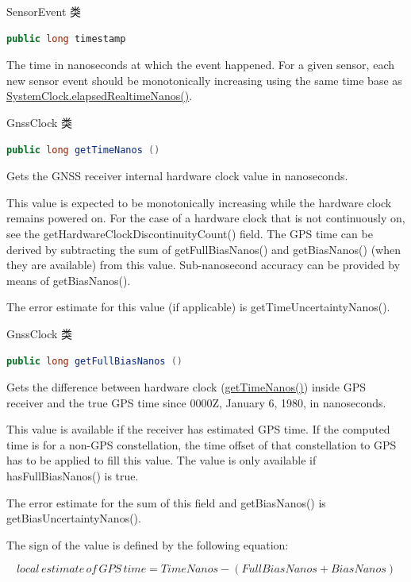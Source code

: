 \documentclass{beamer} %
\begin{document}
\begin{frame}[fragile]{SensorEvent 类}
    \begin{lstlisting}[language = Java]
public long timestamp
    \end{lstlisting}
    The time in nanoseconds at which the event happened. 
    For a given sensor, each new sensor event should be monotonically increasing using the same time base as \hyperlink{CLASSSystemClockMETHODelapsedRealtimeNanos}{SystemClock.elapsedRealtimeNanos()}.
\end{frame}

\begin{frame}[fragile]{GnssClock 类}
\label{CLASSGnssClockMETHODgetTimeNanos}
    \begin{lstlisting}[language = Java]
public long getTimeNanos ()
    \end{lstlisting}
    Gets the GNSS receiver internal hardware clock value in nanoseconds.

    This value is expected to be monotonically increasing while the hardware clock remains powered on. For the case of a hardware clock that is not continuously on, see the getHardwareClockDiscontinuityCount() field. The GPS time can be derived by subtracting the sum of getFullBiasNanos() and getBiasNanos() (when they are available) from this value. Sub-nanosecond accuracy can be provided by means of getBiasNanos().

    The error estimate for this value (if applicable) is getTimeUncertaintyNanos().
\end{frame}

\begin{frame}[fragile]{GnssClock 类}
    \begin{lstlisting}[language = Java]
public long getFullBiasNanos ()
    \end{lstlisting}
    Gets the difference between hardware clock (\hyperlink{CLASSGnssClockMETHODgetTimeNanos}{getTimeNanos()}) inside GPS receiver and the true GPS time since 0000Z, January 6, 1980, in nanoseconds.

    This value is available if the receiver has estimated GPS time. If the computed time is for a non-GPS constellation, the time offset of that constellation to GPS has to be applied to fill this value. The value is only available if hasFullBiasNanos() is true.
    
    The error estimate for the sum of this field and getBiasNanos() is getBiasUncertaintyNanos().
    
    The sign of the value is defined by the following equation:
    \begin{small}
    \begin{equation*}
        local\,estimate\,of\,GPS\,time = TimeNanos - (FullBiasNanos + BiasNanos)
    \end{equation*}
    \end{small}
\end{frame}
\end{document}
